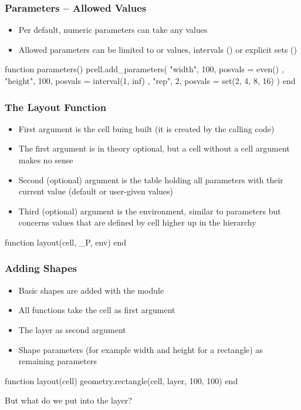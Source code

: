 \documentclass[aspectratio=169, dvipsnames, x11names, svgnames, 11pt]{beamer}
\begin{document}
\begin{frame}[fragile]
    \centering
    \frametitle{Parameters -- Allowed Values}
    \begin{itemize}
        \item Per default, numeric parameters can take any values
        \item Allowed parameters can be limited to  or  values, intervals () or explicit sets ()
    \end{itemize}
    \vfill
    \begin{luacode}
        function parameters()
            pcell.add_parameters({
                { "width", 100, posvals = even() },
                { "height", 100, posvals = interval(1, inf) },
                { "rep", 2, posvals = set(2, 4, 8, 16) }
            })
        end
    \end{luacode}
\end{frame}

\begin{frame}[fragile]
    \centering
    \frametitle{The Layout Function}
    \begin{itemize}
        \item First argument is the cell buing built (it is created by the calling code)
        \item The first argument is in theory optional, but a cell without a cell argument makes no sense
        \item Second (optional) argument is the table holding all parameters with their current value (default or user-given values)
        \item Third (optional) argument is the environment, similar to parameters but concerns values that are defined by cell higher up in the
            hierarchy
    \end{itemize}
    \vfill
    \begin{luacode}
        function layout(cell, _P, env)
        end
    \end{luacode}
\end{frame}

\begin{frame}[fragile]
    \centering
    \frametitle{Adding Shapes}
    \begin{itemize}
        \item Basic shapes are added with the  module
        \item All  functions take the cell as first argument
        \item The layer as second argument
        \item Shape parameters (for example width and height for a rectangle) as remaining parameters
    \end{itemize}
    \vfill
    \begin{luacode}
        function layout(cell)
            geometry.rectangle(cell, layer, 100, 100)
        end
    \end{luacode}
    \vfill
    But what do we put into the layer?
\end{frame}
\end{document}
